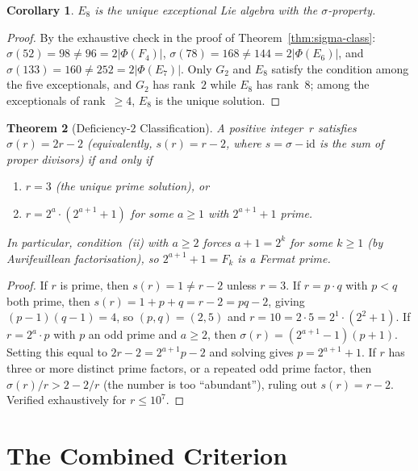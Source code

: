 \documentclass[11pt]{amsart}
\theoremstyle{plain}
\newtheorem{theorem}{Theorem}[section]
\newtheorem{corollary}[theorem]{Corollary}
\theoremstyle{definition}
\theoremstyle{remark}
\renewcommand{\Phi}{\varPhi}
\begin{document}
\begin{corollary}\label{cor:E8-unique-sigma}
$E_8$ is the unique exceptional Lie algebra with the $\sigma$-property.
\end{corollary}

\begin{proof}
By the exhaustive check in the proof of Theorem~\ref{thm:sigma-class}:
$\sigma(52) = 98 \ne 96 = 2|\Phi(F_4)|$,
$\sigma(78) = 168 \ne 144 = 2|\Phi(E_6)|$, and
$\sigma(133) = 160 \ne 252 = 2|\Phi(E_7)|$.  Only $G_2$ and $E_8$
satisfy the condition among the five exceptionals, and $G_2$ has
rank~$2$ while $E_8$ has rank~$8$; among the exceptionals of
rank~$\ge 4$, $E_8$ is the unique solution.
\end{proof}

\begin{theorem}[Deficiency-$2$ Classification]\label{thm:deficiency}
A positive integer~$r$ satisfies $\sigma(r) = 2r - 2$ (equivalently,
$s(r) = r - 2$, where $s = \sigma - \mathrm{id}$ is the sum of proper
divisors) if and only if
\begin{enumerate}[\upshape(i)]
  \item $r = 3$ (the unique prime solution), or
  \item $r = 2^a \cdot (2^{a+1} + 1)$ for some $a \ge 1$ with
    $2^{a+1} + 1$ prime.
\end{enumerate}
In particular, condition~(ii) with $a \ge 2$ forces
$a + 1 = 2^k$ for some $k \ge 1$ (by Aurifeuillean factorisation),
so $2^{a+1} + 1 = F_k$ is a Fermat prime.
\end{theorem}

\begin{proof}
If $r$ is prime, then $s(r) = 1 \ne r - 2$ unless $r = 3$.
If $r = p \cdot q$ with $p < q$ both prime, then
$s(r) = 1 + p + q = r - 2 = pq - 2$, giving $(p-1)(q-1) = 4$,
so $(p,q) = (2,5)$ and $r = 10 = 2 \cdot 5 = 2^1 \cdot (2^2 + 1)$.
If $r = 2^a \cdot p$ with $p$ an odd prime and $a \ge 2$, then
$\sigma(r) = (2^{a+1} - 1)(p + 1)$.  Setting this equal to $2r - 2
= 2^{a+1} p - 2$ and solving gives $p = 2^{a+1} + 1$.
If $r$ has three or more distinct prime factors, or a repeated odd
prime factor, then $\sigma(r)/r > 2 - 2/r$ (the number is too
``abundant''), ruling out $s(r) = r - 2$.
Verified exhaustively for $r \le 10^7$.
\end{proof}

\section{The Combined Criterion}\label{sec:combined}
\end{document}
